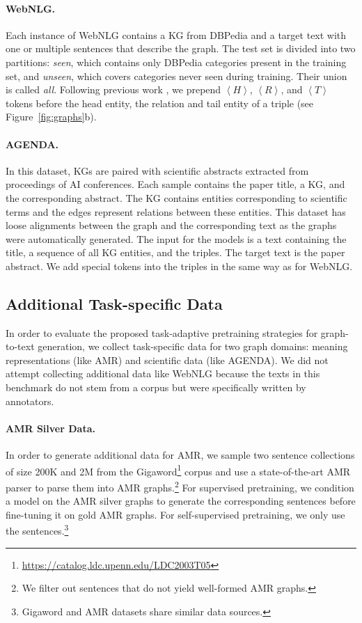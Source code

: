 \documentclass[11pt]{article}
\newcommand{\ourtag}[1]{\ensuremath{\left\langle #1 \right\rangle}}
\begin{document}
\paragraph{WebNLG.} Each instance of WebNLG contains a KG from DBPedia \cite{10.5555/1785162.1785216} and a target text with one or multiple sentences that describe the graph. The test set is divided into two partitions: \textit{seen}, which contains only DBPedia categories present in the training set, and \textit{unseen}, which covers categories never seen during training. Their union is called \textit{all}.
Following previous work \cite{harkous2020text}, we prepend \ourtag{H}, \ourtag{R}, and \ourtag{T} tokens before the head entity, the relation and tail entity of a triple (see Figure~\ref{fig:graphs}b).

\paragraph{AGENDA.} In this dataset, KGs are paired with scientific abstracts extracted from proceedings of AI conferences. Each sample contains the paper title, a KG, and the corresponding abstract. The KG contains entities corresponding to scientific terms and the edges represent relations between these entities. This dataset has loose alignments between the graph and the corresponding text as the graphs were automatically generated. The input for the models is a text containing the title, a sequence of all KG entities, and the triples. The target text is the paper abstract. We add special tokens into the triples in the same way as for WebNLG. 





\subsection{Additional Task-specific Data}
In order to evaluate the proposed task-adaptive pretraining strategies for graph-to-text generation, we collect task-specific data for two graph domains: meaning representations (like AMR) and scientific data (like AGENDA).
We did not attempt collecting additional data like WebNLG because the texts in this benchmark do not stem from a corpus but were specifically written by annotators.



\paragraph{AMR Silver Data.} In order to generate additional data for AMR, we sample two sentence collections of size 200K and 2M from the Gigaword\footnote{\href{https://catalog.ldc.upenn.edu/LDC2003T05}{https://catalog.ldc.upenn.edu/LDC2003T05}} corpus and use a state-of-the-art AMR parser \cite{cai-lam-2020-amr} to parse them into AMR graphs.\footnote{We filter out sentences that do not yield well-formed AMR graphs.} For supervised pretraining, we condition a model on the AMR silver graphs to generate the corresponding sentences before fine-tuning it on gold AMR graphs. For self-supervised pretraining, we only use the sentences.\footnote{Gigaword and AMR datasets share similar data sources.}
\end{document}
